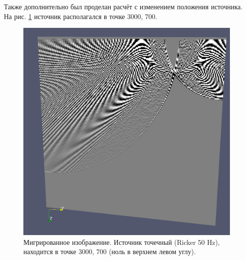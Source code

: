 \documentclass{article}
\begin{document}
Также дополнительно был проделан расчёт с изменением положения источника. На рис. \ref{comparison_2} источник располагался в точке 3000, 700.
\begin{figure}[ht]
  \center
  \includegraphics[scale=0.2]{pic/point_source_3000_700.png}
  \caption{Мигрированное изображение. Источник точечный (Ricker 50 Hz), находится в точке 3000, 700 (ноль в верхнем левом углу).}
\label{comparison_2}
\end{figure}
\end{document}
